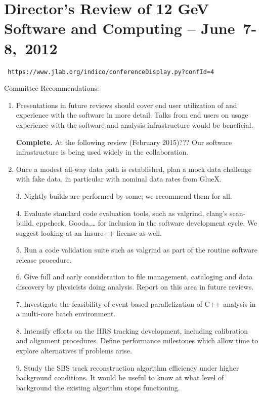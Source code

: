 \documentclass[12pt]{article}
\begin{document}
\section{Director’s Review of 12 GeV Software and Computing – June~7-8,~2012}

\begin{center}\tt
https://www.jlab.org/indico/conferenceDisplay.py?confId=4
\end{center}

Committee Recommendations:

\begin{enumerate}

\item Presentations in future reviews should cover end user
  utilization of and experience with the software in more
  detail. Talks from end users on usage experience with the software
  and analysis infrastructure would be beneficial.

  {\bf Complete.} At the following review (February 2015)??? Our software infrastructure is being used widely in the collaboration. 

\item Once a modest all-way data path is established, plan a mock data
  challenge with fake data, in particular with nominal data rates from
  GlueX.

3. Nightly builds are performed by some; we recommend them for all.

4. Evaluate standard code evaluation tools, such as valgrind, clang’s scan-build, cppcheck, Gooda,… for inclusion in the software development cycle. We suggest looking at an Insure++ license as well.

5. Run a code validation suite such as valgrind as part of the routine software release procedure.

6. Give full and early consideration to file management, cataloging and data discovery by physicists doing analysis. Report on this area in future reviews.

7. Investigate the feasibility of event-based parallelization of C++ analysis in a multi-core batch environment.

8. Intensify efforts on the HRS tracking development, including calibration and alignment procedures. Define performance milestones which allow time to explore alternatives if problems arise.

9. Study the SBS track reconstruction algorithm efficiency under higher background conditions. It would be useful to know at what level of background the existing algorithm stops functioning.


\end{enumerate}
\end{document}
